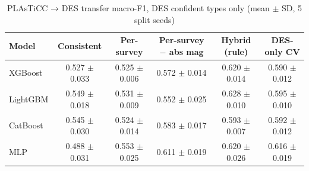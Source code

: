 \begin{table}
\centering
\caption{PLAsTiCC → DES transfer macro-F1, DES confident types only (mean $\pm$ SD, 5 split seeds)}
\begin{tabular}{lccccc}
\hline
Model & Consistent & Per-survey & Per-survey $-$ abs mag & Hybrid (rule) & DES-only CV \\
\hline
XGBoost & 0.527 $\pm$ 0.033 & 0.525 $\pm$ 0.006 & 0.572 $\pm$ 0.014 & 0.620 $\pm$ 0.014 & 0.590 $\pm$ 0.012 \\
LightGBM & 0.549 $\pm$ 0.018 & 0.531 $\pm$ 0.009 & 0.552 $\pm$ 0.025 & 0.628 $\pm$ 0.010 & 0.595 $\pm$ 0.010 \\
CatBoost & 0.545 $\pm$ 0.030 & 0.524 $\pm$ 0.014 & 0.583 $\pm$ 0.017 & 0.593 $\pm$ 0.007 & 0.592 $\pm$ 0.012 \\
MLP & 0.488 $\pm$ 0.031 & 0.553 $\pm$ 0.025 & 0.611 $\pm$ 0.019 & 0.620 $\pm$ 0.026 & 0.616 $\pm$ 0.019 \\
\hline
\end{tabular}
\end{table}
